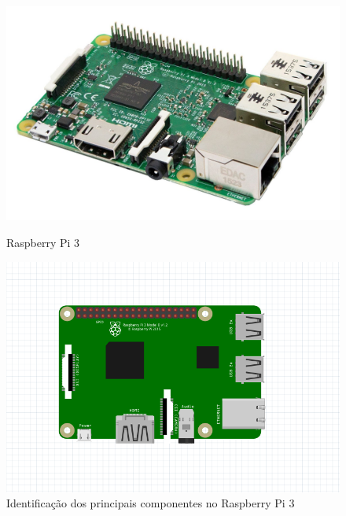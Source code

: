 \begin{figure}[h]
	\centering
	\begin{minipage}[b]{0.4\textwidth}
		\includegraphics[width=\textwidth]{img/hardware/rasp3-img.jpg}
		\caption{Raspberry Pi 3}
		\label{rasp1}
	\end{minipage}
	\hfill
	\begin{minipage}[b]{0.5\textwidth}
		\includegraphics[width=\textwidth]{img/hardware/rasp-esquema.PNG}
		\caption{Identificação dos principais componentes no Raspberry Pi 3 }
	\end{minipage}
\end{figure}




